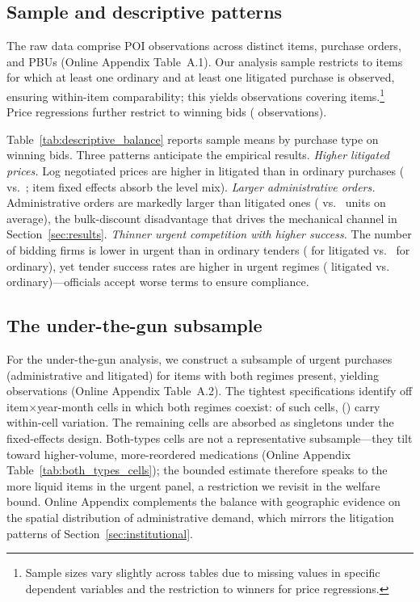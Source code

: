 \subsection{Sample and descriptive patterns}

The raw data comprise \BPnPOIfull{} POI observations across
\BPnItemsFull{} distinct items, \BPnOrdersFull{} purchase orders,
and \BPnPBUsObserved{} PBUs (Online Appendix Table~A.1). Our
analysis sample restricts to items for which at least one ordinary
and at least one litigated purchase is observed, ensuring within-item
comparability; this yields \BPnAnalysisSample{} observations
covering \BPnItemsAnalysis{} items.\footnote{Sample sizes vary
slightly across tables due to missing values in specific dependent
variables and the restriction to winners for price regressions.}
Price regressions further restrict to winning bids (\BPnWinners{}
observations).

Table~\ref{tab:descriptive_balance} reports sample means by purchase
type on winning bids. Three patterns anticipate the empirical
results. \emph{Higher litigated prices.} Log negotiated prices are
higher in litigated than in ordinary purchases (\BPmeanLogNegLit{}
vs.\ \BPmeanLogNegOrd; item fixed effects absorb the level mix).
\emph{Larger administrative orders.} Administrative orders are
markedly larger than litigated ones (\BPmeanQtyAdm{} vs.\
\BPmeanQtyLit{} units on average), the bulk-discount disadvantage
that drives the mechanical channel in Section~\ref{sec:results}.
\emph{Thinner urgent competition with higher success.} The number of
bidding firms is lower in urgent than in ordinary tenders
(\BPmeanFirmsLit{} for litigated vs.\ \BPmeanFirmsOrd{} for
ordinary), yet tender success rates are higher in urgent regimes
(\BPsuccessLit{} litigated vs.\ \BPsuccessOrd{} ordinary)---officials
accept worse terms to ensure compliance.



\subsection{The under-the-gun subsample}

For the under-the-gun analysis, we construct a subsample of urgent
purchases (administrative and litigated) for items with both regimes
present, yielding \BPnUTG{} observations (Online Appendix
Table~A.2). The tightest specifications identify off
item$\times$year-month cells in which both regimes coexist: of
\BPutgCellsItemYM{} such cells, \BPutgCellsBoth{}
(\BPutgCellsBothPct) carry within-cell variation. The remaining
cells are absorbed as singletons under the fixed-effects design.
Both-types cells are not a representative subsample---they tilt
toward higher-volume, more-reordered medications (Online Appendix
Table~\ref{tab:both_types_cells}); the bounded estimate therefore
speaks to the more liquid items in the urgent panel, a restriction
we revisit in the welfare bound. Online Appendix complements the
balance with geographic evidence on the spatial distribution of
administrative demand, which mirrors the litigation patterns of
Section~\ref{sec:institutional}.
